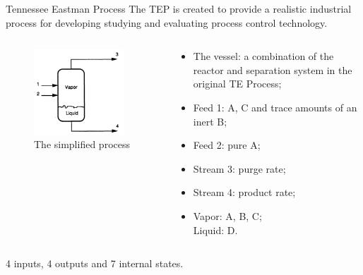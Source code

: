 \documentclass[10pt]{beamer}
\begin{document}
\begin{frame}{Tennessee Eastman Process}
The TEP is created to provide a realistic industrial process for developing studying and evaluating process control technology. 
  \begin{columns}
    \begin{column}{0.45\textwidth}
      \begin{figure}
        \includegraphics[width=0.9\textwidth]{simplifiedmodel.png}
        \caption{The simplified process}
      \end{figure}
    \end{column}
    \begin{column}{0.55\textwidth} 		
      \begin{itemize}
      \item The vessel: a combination of the reactor and separation system in the original TE Process;
      \item Feed 1: A, C and trace amounts of an inert B;
      \item Feed 2: pure A;
      \item Stream 3: purge rate;
      \item Stream 4: product rate;
      \item Vapor: A, B, C;\\
        Liquid: D.
      \end{itemize}
    \end{column}
  \end{columns}
  4 inputs, 4 outputs and 7 internal states.
\end{frame}
\end{document}
